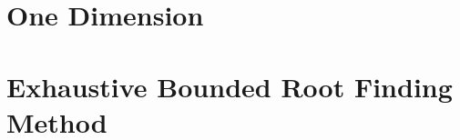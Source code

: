 \documentclass[12pt,letterpaper,oneside]{book}
\makeatletter
\theoremstyle{plain}
\theoremstyle{definition}
\theoremstyle{remark}
\numberwithin{theorem}{chapter}
\def\startabstractpage#1{%
 \newpage
 \setcounter{page}{1}   %
 \addcontentsline{toc}{chapter}{ABSTRACT}
 \@restonecolfalse\if@twocolumn\@restonecoltrue\onecolumn\fi
 \hbox{ }
 \twoinmar
 \centerline{ABSTRACT}
 \vspace{0.4in}
 \noindent #1
 \vspace{0.25in}\\
}
\makeatother
\begin{document}

\makeatletter
\if@twoside \setcounter{page}{4} \else \setcounter{page}{1} \fi
\makeatother



%


%
\chapter{One Dimension}



\appendix
\chapter{Exhaustive Bounded Root Finding Method}

%
%
%
\end{document}
